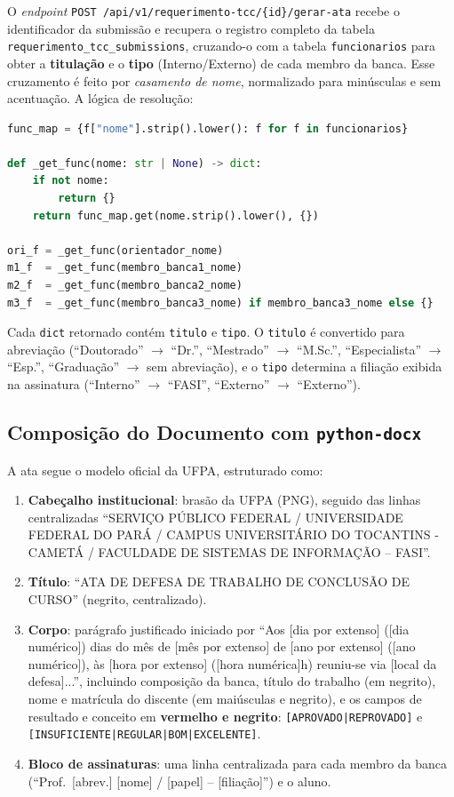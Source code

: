\documentclass[12pt,a4paper]{report}
\begin{document}
O \textit{endpoint} \texttt{POST /api/v1/requerimento-tcc/\{id\}/gerar-ata}
recebe o identificador da submissão e recupera o registro completo da tabela
\texttt{requerimento\_tcc\_submissions}, cruzando-o com a tabela
\texttt{funcionarios} para obter a \textbf{titulação} e o \textbf{tipo}
(Interno/Externo) de cada membro da banca. Esse cruzamento é feito por
\emph{casamento de nome}, normalizado para minúsculas e sem acentuação. A
lógica de resolução:

\begin{lstlisting}[language=Python,caption=Busca de titulação e tipo por nome de funcionário.]
func_map = {f["nome"].strip().lower(): f for f in funcionarios}

def _get_func(nome: str | None) -> dict:
    if not nome:
        return {}
    return func_map.get(nome.strip().lower(), {})

ori_f = _get_func(orientador_nome)
m1_f  = _get_func(membro_banca1_nome)
m2_f  = _get_func(membro_banca2_nome)
m3_f  = _get_func(membro_banca3_nome) if membro_banca3_nome else {}
\end{lstlisting}

Cada \texttt{dict} retornado contém \texttt{titulo} e \texttt{tipo}. O
\texttt{titulo} é convertido para abreviação (``Doutorado'' $\to$ ``Dr.'',
``Mestrado'' $\to$ ``M.Sc.'', ``Especialista'' $\to$ ``Esp.'', ``Graduação''
$\to$ sem abreviação), e o \texttt{tipo} determina a filiação exibida na
assinatura (``Interno'' $\to$ ``FASI'', ``Externo'' $\to$ ``Externo'').

\subsection{Composição do Documento com \texttt{python-docx}}

A ata segue o modelo oficial da UFPA, estruturado como:

\begin{enumerate}
  \item \textbf{Cabeçalho institucional}: brasão da UFPA (PNG), seguido das
        linhas centralizadas ``SERVIÇO PÚBLICO FEDERAL / UNIVERSIDADE FEDERAL
        DO PARÁ / CAMPUS UNIVERSITÁRIO DO TOCANTINS - CAMETÁ / FACULDADE DE
        SISTEMAS DE INFORMAÇÃO -- FASI''.
  \item \textbf{Título}: ``ATA DE DEFESA DE TRABALHO DE CONCLUSÃO DE CURSO''
        (negrito, centralizado).
  \item \textbf{Corpo}: parágrafo justificado iniciado por ``Aos [dia por
        extenso] ([dia numérico]) dias do mês de [mês por extenso] de [ano por
        extenso] ([ano numérico]), às [hora por extenso] ([hora numérica]h)
        reuniu-se via [local da defesa]...'', incluindo composição da banca,
        título do trabalho (em negrito), nome e matrícula do discente (em
        maiúsculas e negrito), e os campos de resultado e conceito em
        \textbf{vermelho e negrito}: \texttt{[APROVADO|REPROVADO]} e
        \texttt{[INSUFICIENTE|REGULAR|BOM|EXCELENTE]}.
  \item \textbf{Bloco de assinaturas}: uma linha centralizada para cada membro
        da banca (``Prof.\ [abrev.] [nome] / [papel] -- [filiação]'') e o
        aluno.
\end{enumerate}
\end{document}

